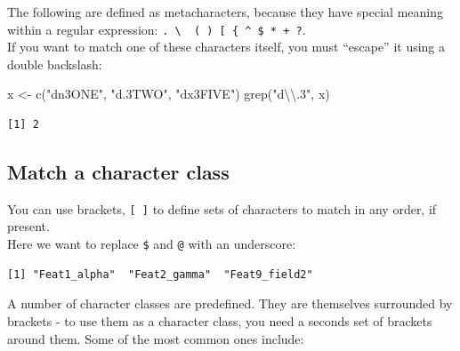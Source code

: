 \documentclass[
]{book}
\newenvironment{Shaded}{\begin{snugshade}}{\end{snugshade}}
\newcommand{\FunctionTok}[1]{\textcolor[rgb]{0.00,0.00,0.00}{#1}}
\newcommand{\NormalTok}[1]{#1}
\newcommand{\OtherTok}[1]{\textcolor[rgb]{0.56,0.35,0.01}{#1}}
\newcommand{\SpecialCharTok}[1]{\textcolor[rgb]{0.00,0.00,0.00}{#1}}
\newcommand{\StringTok}[1]{\textcolor[rgb]{0.31,0.60,0.02}{#1}}
\begin{document}
The following are defined as metacharacters, because they have special meaning within a regular expression: \texttt{.\ \textbackslash{}\ \textbar{}\ (\ )\ {[}\ \{\ \^{}\ \$\ *\ +\ ?}.\\
If you want to match one of these characters itself, you must ``escape'' it using a double backslash:

\begin{Shaded}
\begin{Highlighting}[]
\NormalTok{x }\OtherTok{\textless{}{-}} \FunctionTok{c}\NormalTok{(}\StringTok{"dn3ONE"}\NormalTok{, }\StringTok{"d.3TWO"}\NormalTok{, }\StringTok{"dx3FIVE"}\NormalTok{)}
\FunctionTok{grep}\NormalTok{(}\StringTok{"d}\SpecialCharTok{\textbackslash{}\textbackslash{}}\StringTok{.3"}\NormalTok{, x)}
\end{Highlighting}
\end{Shaded}

\begin{verbatim}
[1] 2
\end{verbatim}

\hypertarget{match-a-character-class}{%
\subsection{Match a character class}\label{match-a-character-class}}

You can use brackets, \texttt{{[}\ {]}} to define sets of characters to match in any order, if present.\\
Here we want to replace \texttt{\$} and \texttt{@} with an underscore:

\begin{Shaded}
\end{Shaded}

\begin{verbatim}
[1] "Feat1_alpha"  "Feat2_gamma"  "Feat9_field2"
\end{verbatim}

A number of character classes are predefined. They are themselves surrounded by brackets - to use them as a character class, you need a seconds set of brackets around them. Some of the most common ones include:
\end{document}

